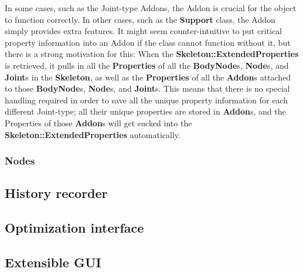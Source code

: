 In some cases, such as the Joint-type Addons, the Addon is crucial for the object to function correctly. In other cases, such as the \textbf{Support} class, the Addon simply provides extra features. It might seem counter-intuitive to put critical property information into an Addon if the class cannot function without it, but there is a strong motivation for this: When the \textbf{Skeleton::ExtendedProperties} is retrieved, it pulls in all the \textbf{Properties} of all the \textbf{BodyNode}s, \textbf{Node}s, and \textbf{Joint}s in the \textbf{Skeleton}, as well as the \textbf{Properties} of all the \textbf{Addon}s attached to those \textbf{BodyNode}s, \textbf{Node}s, and \textbf{Joint}s. This means that there is no special handling required in order to save all the unique property information for each different Joint-type; all their unique properties are stored in \textbf{Addon}s, and the Properties of those \textbf{Addon}s will get sucked into the \textbf{Skeleton::ExtendedProperties} automatically.

\subsubsection{Nodes}
\label{sec:nodes}
\subsection{History recorder}
\subsection{Optimization interface}
\label{sec:optimizer}
\subsection{Extensible GUI}
